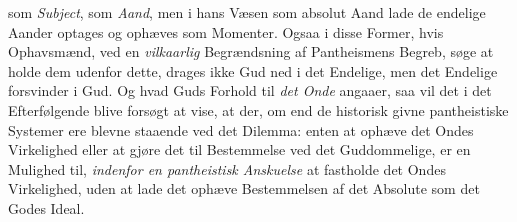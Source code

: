 som \emph{Subject}, som \emph{Aand}, men i hans Væsen som absolut Aand lade de
endelige Aander optages og ophæves som Momenter. Ogsaa i disse
 Former, hvis Ophavsmænd, ved en \emph{vilkaarlig} Begrændsning af Pantheismens
Begreb, søge at holde dem udenfor dette, drages ikke Gud ned i det Endelige,
men det Endelige forsvinder i Gud. Og hvad Guds Forhold til \emph{det Onde}
angaaer, saa vil det i det Efterfølgende blive forsøgt at vise, at der, om end
de historisk givne pantheistiske Systemer ere blevne staaende ved det Dilemma:
enten at ophæve det Ondes Virkelighed eller at gjøre det til Bestemmelse ved
det Guddommelige, er en Mulighed til, \emph{indenfor en pantheistisk
Anskuelse} at fastholde det Ondes Virkelighed, uden at lade det ophæve
Bestemmelsen af det Absolute som det Godes Ideal.

